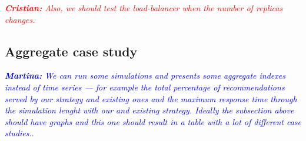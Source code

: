 \textcolor{red}{\textit{\textbf{Cristian:} Also, we should test the
    load-balancer when the number of replicas changes.}}

\subsection{Aggregate case study}

\textcolor{blue}{\textit{\textbf{Martina:} We can run some simulations
    and presents some aggregate indexes instead of time series --- for
    example the total percentage of recommendations served by our
    strategy and existing ones and the maximum response time through
    the simulation lenght with our and existing strategy. Ideally the
    subsection above should have graphs and this one should result in
    a table with a lot of different case studies.}}.



